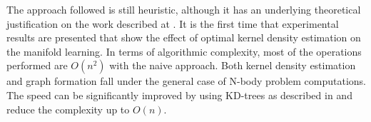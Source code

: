 \documentclass[12pt,letterpaper,doublespaced,ETD,dvips,proposal]{gtthesis}
\begin{document}
\begin{Body}
The approach followed is still  heuristic, although it has  an
underlying theoretical justification on the work described at
\cite{jenssen17lpd}. It is the first time that experimental results
are presented that show the effect of optimal kernel density
estimation on the manifold learning.
 In terms of algorithmic
complexity, most of the operations performed are $O(n^2)$ with the
naive approach. Both kernel density estimation and graph formation
fall under the general case of N-body problem computations. The
speed can be significantly improved by using KD-trees as described
in \cite{gray2001nbp} and reduce the complexity up to $O(n)$.



%


\end{Body}
\end{document}
